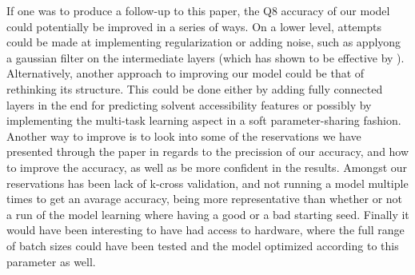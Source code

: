 If one was to produce a follow-up to this paper, the Q8 accuracy of our model could potentially be improved in a series of ways. On a lower level, attempts could be made at implementing regularization or adding noise, such as applyong a gaussian filter on the intermediate layers (which has shown to be effective by \citeauthor{zhou-and-troyanskaya-2014}).\\
Alternatively, another approach to improving our model could be that of rethinking its structure. This could be done either by adding fully connected layers in the end for predicting solvent accessibility features or possibly by implementing the multi-task learning aspect in a soft parameter-sharing fashion. \\
Another way to improve is to look into some of the reservations we have presented through the paper in regards to the precission of our accuracy, and how to improve the accuracy, as well as be more confident in the results. Amongst our reservations has been lack of k-cross validation, and not running a model multiple times to get an avarage accuracy, being more representative than whether or not a run of the model learning where having a good or a bad starting seed. Finally it would have been interesting to have had access to hardware, where the full range of batch sizes could have been tested and the model optimized according to this parameter as well.